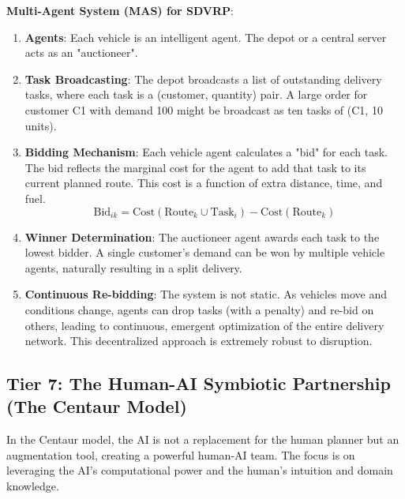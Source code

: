 \documentclass{article}
\begin{document}
\textbf{Multi-Agent System (MAS) for SDVRP}:
\begin{enumerate}
    \item \textbf{Agents}: Each vehicle is an intelligent agent. The depot or a central server acts as an "auctioneer".
    \item \textbf{Task Broadcasting}: The depot broadcasts a list of outstanding delivery tasks, where each task is a (customer, quantity) pair. A large order for customer C1 with demand 100 might be broadcast as ten tasks of (C1, 10 units).
    \item \textbf{Bidding Mechanism}: Each vehicle agent calculates a "bid" for each task. The bid reflects the marginal cost for the agent to add that task to its current planned route. This cost is a function of extra distance, time, and fuel.
        \begin{equation}
        \text{Bid}_{ik} = \text{Cost}(\text{Route}_k \cup \text{Task}_i) - \text{Cost}(\text{Route}_k)
        \end{equation}
    \item \textbf{Winner Determination}: The auctioneer agent awards each task to the lowest bidder. A single customer's demand can be won by multiple vehicle agents, naturally resulting in a split delivery.
    \item \textbf{Continuous Re-bidding}: The system is not static. As vehicles move and conditions change, agents can drop tasks (with a penalty) and re-bid on others, leading to continuous, emergent optimization of the entire delivery network. This decentralized approach is extremely robust to disruption.
\end{enumerate}

\subsection{Tier 7: The Human-AI Symbiotic Partnership (The Centaur Model)}
In the Centaur model, the AI is not a replacement for the human planner but an augmentation tool, creating a powerful human-AI team. The focus is on leveraging the AI's computational power and the human's intuition and domain knowledge.
\end{document}
